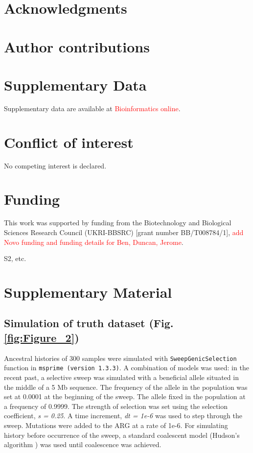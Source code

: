 \documentclass[unnumsec,webpdf,contemporary,large,namedate]{oup-authoring-template}%
\begin{document}
\section*{Acknowledgments}
\section*{Author contributions}
\section*{Supplementary Data}
Supplementary data are available at \textcolor{red}{Bioinformatics online}.
\section*{Conflict of interest}
No competing interest is declared.
\section*{Funding}
This work was supported by funding from the Biotechnology and Biological
Sciences Research Council (UKRI-BBSRC) [grant number BB/T008784/1],
\textcolor{red}{add Novo funding and funding details for Ben, Duncan, Jerome}.



\clearpage \onecolumn \setcounter{figure}{0}  %
\renewcommand{\thefigure}{S\arabic{figure}}  %
S2, etc. \section{Supplementary Material} \subsection{Simulation of truth
dataset (Fig. \ref{fig:Figure_2})} \label{subsec:sweep_simulation} Ancestral
histories of 300 samples were simulated with \texttt{SweepGenicSelection}
function in \texttt{msprime (version 1.3.3)}. A combination of models was used:
in the recent past, a selective sweep was simulated with a beneficial allele
situated in the middle of a 5 Mb sequence. The frequency of the allele in the
population was set at 0.0001 at the beginning of the sweep. The allele fixed in
the population at a frequency of 0.9999. The strength of selection was set
using the selection coefficient, \textit{s = 0.25}. A time increment,
\textit{dt = 1e-6} was used to step through the sweep. Mutations were added to
the ARG at a rate of 1e-6. For simulating history before occurrence of the
sweep, a standard coalescent model (Hudson's algorithm \citep{Hudson1983}) was
used until coalescence was achieved. 
\end{document}
